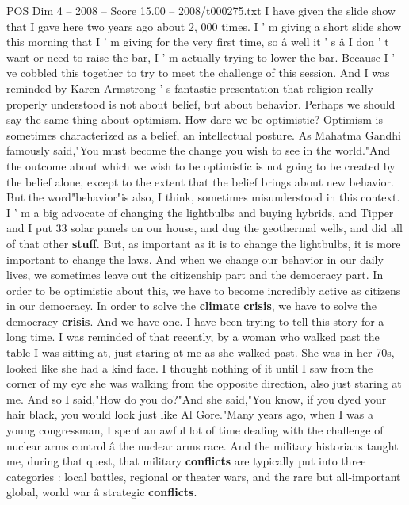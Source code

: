 \begin{textsample}{POS Dim 4 – 2008 – Score 15.00 – 2008/t000275.txt}  \label{ex:f4_pos_057}
I have given the slide show that I gave here two years ago about 2, 000 times.
I ' m giving a short slide show this morning that I ' m giving for the very first time, so â well it ' s â I don ' t want or need to raise the bar, I ' m actually trying to lower the bar.
Because I ' ve cobbled this together to try to meet the challenge of this session.
And I was reminded by Karen Armstrong ' s fantastic presentation that religion really properly understood is not about belief, but about behavior.
Perhaps we should say the same thing about optimism.
How dare we be optimistic?
Optimism is sometimes characterized as a belief, an intellectual posture.
As Mahatma Gandhi famously said,"You must become the change you wish to see in the world."And the outcome about which we wish to be optimistic is not going to be created by the belief alone, except to the extent that the belief brings about new behavior.
But the word"behavior"is also, I think, sometimes misunderstood in this context.
I ' m a big advocate of changing the lightbulbs and buying hybrids, and Tipper and I put 33 solar panels on our house, and dug the geothermal wells, and did all of that other \textbf{stuff}.
But, as important as it is to change the lightbulbs, it is more important to change the laws.
And when we change our behavior in our daily lives, we sometimes leave out the citizenship part and the democracy part.
In order to be optimistic about this, we have to become incredibly active as citizens in our democracy.
In order to solve the \textbf{climate} \textbf{crisis}, we have to solve the democracy \textbf{crisis}.
And we have one.
I have been trying to tell this story for a long time.
I was reminded of that recently, by a woman who walked past the table I was sitting at, just staring at me as she walked past.
She was in her 70s, looked like she had a kind face.
I thought nothing of it until I saw from the corner of my eye she was walking from the opposite direction, also just staring at me.
And so I said,"How do you do?"And she said,"You know, if you dyed your hair black, you would look just like Al Gore."Many years ago, when I was a young congressman, I spent an awful lot of time dealing with the challenge of nuclear arms control â the nuclear arms race.
And the military historians taught me, during that quest, that military \textbf{conflicts} are typically put into three categories : local battles, regional or theater wars, and the rare but all-important global, world war â strategic \textbf{conflicts}.

\end{textsample}
